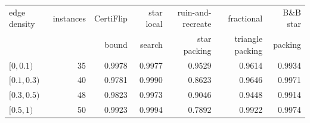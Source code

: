 \begin{tabular}{lrrrrrr}
\toprule
edge density & instances & CertiFlip & star local & ruin-and-recreate & fractional & B\&B star \\
 & & bound & search & star packing & triangle packing & packing \\
\midrule
$[0,0.1)$ & 35 & 0.9978 & 0.9977 & 0.9529 & 0.9614 & 0.9934 \\
$[0.1,0.3)$ & 40 & 0.9781 & 0.9990 & 0.8623 & 0.9646 & 0.9971 \\
$[0.3,0.5)$ & 48 & 0.9823 & 0.9973 & 0.9046 & 0.9448 & 0.9914 \\
$[0.5,1)$ & 50 & 0.9923 & 0.9994 & 0.7892 & 0.9922 & 0.9974 \\
\bottomrule
\end{tabular}
